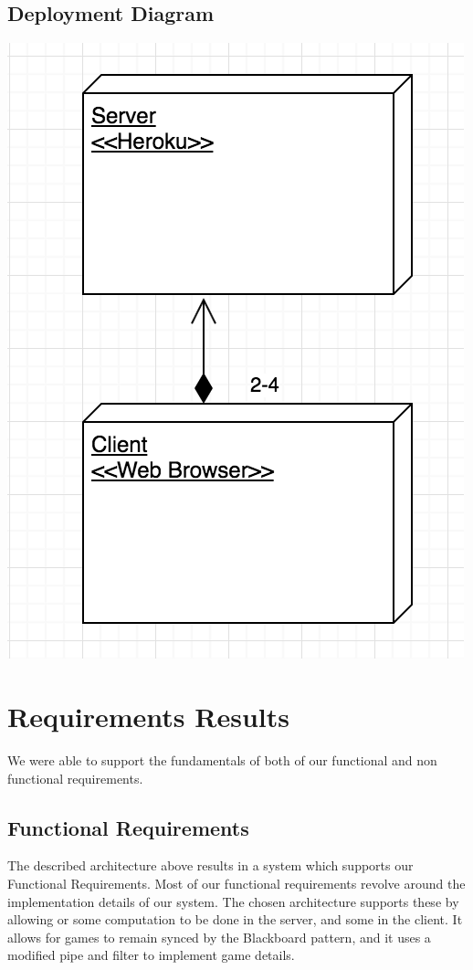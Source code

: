 \documentclass[12pt]{report}
\begin{document}
\subsection{Deployment Diagram}
\includegraphics[]{images/deploy_diagram.png}

\section{Requirements Results}
We were able to support the fundamentals of both of our functional and non functional requirements. 
\subsection{Functional Requirements}
The described architecture above results in a system which supports our Functional Requirements. Most of our functional requirements revolve around the implementation details of our system. The chosen architecture supports these by allowing or some computation to be done in the server, and some in the client. It allows for games to remain synced by the Blackboard pattern, and it uses a modified pipe and filter to implement game details.  
\end{document}
